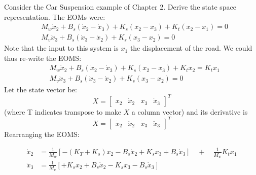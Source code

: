 \documentclass[letterpaper]{book}
\begin{document}
\begin{Example}\label{suspensionstatespace}
Consider the Car Suspension example of Chapter 2. Derive the state space representation.
The EOMs were:
\begin{align*}
&M_w\dot{x}_2+B_s(\dot{x}_2-\dot{x}_3)+K_s(x_2-x_3)+K_t(x_2-x_1) =0 \\
&M_v\ddot{x}_3+B_s(\dot{x}_3-\dot{x}_2)+K_s(x_3-x_2) = 0
\end{align*}
Note that the input to this system is $x_1$ the displacement of the road.  We could thus
re-write the EOMS:
\begin{align*}
&M_w\dot{x}_2+B_s(\dot{x}_2-\dot{x}_3)+K_s(x_2-x_3)+K_tx_2 = K_tx_1 \\
&M_v\ddot{x}_3+B_s(\dot{x}_3-\dot{x}_2)+K_s(x_3-x_2) = 0
\end{align*}
Let the state vector be:
\[
X = \begin{bmatrix}x_2 & \dot{x}_2 & x_3 & \dot{x}_3\end{bmatrix}^T
\]
(where T indicates transpose to make $X$ a column vector)
and its derivative is
\[
\dot{X} = \begin{bmatrix}\dot{x}_2 & \ddot{x}_2 & \dot{x}_3 & \ddot{x}_3\end{bmatrix}^T
\]
Rearranging the EOMS:

\begin{align*}
\dot{x}_2  &= \frac{1}{M_w}\left [-(K_T+K_s)x_2-B_s\dot{x}_2+K_sx_3+B_s\dot{x}_3\right]\quad+\quad \frac{1}{M_w}K_tx_1 \\
\ddot{x}_3 &= \frac{1}{M_v}\left[+K_sx_2+B_s\dot{x}_2 -K_sx_3-B_s\dot{x}_3\right] 
\end{align*}


\end{Example}
\end{document}
